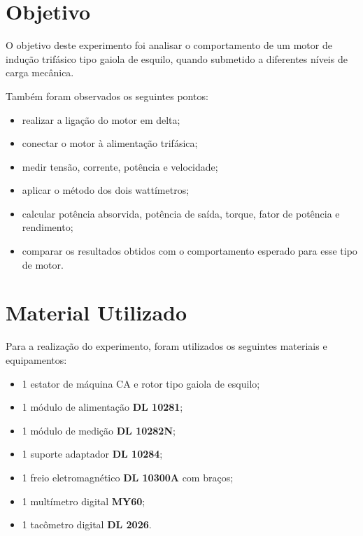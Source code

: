 \documentclass[12pt,a4paper]{article}
\begin{document}
\newpage

\section{Objetivo}

O objetivo deste experimento foi analisar o comportamento de um motor de indução trifásico tipo gaiola de esquilo, quando submetido a diferentes níveis de carga mecânica.

Também foram observados os seguintes pontos:

\begin{itemize}
\item realizar a ligação do motor em delta;
\item conectar o motor à alimentação trifásica;
\item medir tensão, corrente, potência e velocidade;
\item aplicar o método dos dois wattímetros;
\item calcular potência absorvida, potência de saída, torque, fator de potência e rendimento;
\item comparar os resultados obtidos com o comportamento esperado para esse tipo de motor.
\end{itemize}

\newpage

\section{Material Utilizado}

Para a realização do experimento, foram utilizados os seguintes materiais e equipamentos:

\begin{itemize}
\item 1 estator de máquina CA e rotor tipo gaiola de esquilo;
\item 1 módulo de alimentação \textbf{DL 10281};
\item 1 módulo de medição \textbf{DL 10282N};
\item 1 suporte adaptador \textbf{DL 10284};
\item 1 freio eletromagnético \textbf{DL 10300A} com braços;
\item 1 multímetro digital \textbf{MY60};
\item 1 tacômetro digital \textbf{DL 2026}.
\end{itemize}
\end{document}
